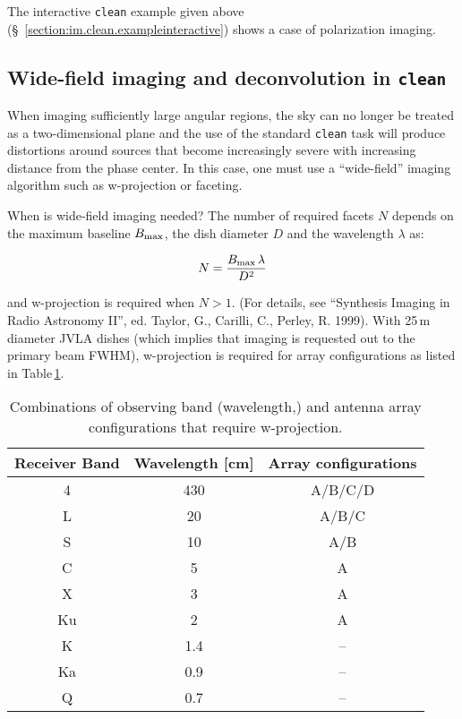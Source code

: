 The interactive {\tt clean} example given above 
(\S~\ref{section:im.clean.exampleinteractive}) shows
a case of polarization imaging. 


\subsection{Wide-field imaging and deconvolution in {\tt clean}}
\label{section:im.clean.widefield}

When imaging sufficiently large angular regions, the sky can no longer
be treated as a two-dimensional plane and the use of the standard {\tt clean}
task will produce distortions around sources that become
increasingly severe with increasing distance from the phase center.
In this case, one must use a ``wide-field'' imaging algorithm such as
w-projection or faceting.

When is wide-field imaging needed? The number of required facets $N$ depends on
the  maximum baseline $B_{\rm max}$, the dish diameter $D$ and the
wavelength $\lambda$ as:

\begin{equation}
N=\frac{B_{\rm max}\,\lambda}{D^{2}}
\label{eq:imaging.wproj.facets}
\end{equation} 

and w-projection is required when $N>1$. (For details, see ``Synthesis
Imaging in Radio Astronomy II'', ed. Taylor, G., Carilli, C., Perley,
R. 1999). With 25\,m diameter JVLA dishes (which implies that imaging
is requested out to the primary beam FWHM), w-projection is required
for array configurations as listed in
Table\,\ref{tab:imaging.w-projection.config}.

\begin{table}
\begin{tabular}{ccc}
\hline
Receiver Band & Wavelength [cm] & Array configurations \\
\hline
4             &  430            &  A/B/C/D \\
L             &  20             &  A/B/C \\
S             &  10             &  A/B \\
C             &  5              &  A \\
X             &  3              &  A \\
Ku            &  2              &  A \\
K             &  1.4            &  -- \\
Ka            &  0.9            &  -- \\
Q             &  0.7            &  -- \\
\hline
\end{tabular}
\caption{Combinations of observing band (wavelength,) and antenna
  array configurations that require w-projection. \label{tab:imaging.w-projection.config}}
\end{table}



